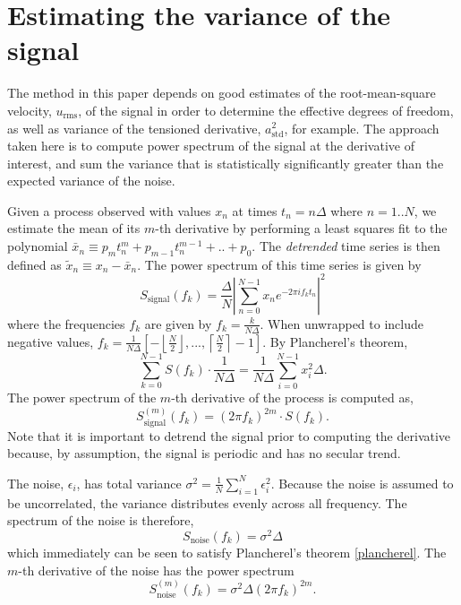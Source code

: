 \documentclass[10pt,journal]{IEEEtran}
\begin{document}
\section{Estimating the variance of the signal}
\label{variance_estimate}

The method in this paper depends on good estimates of the root-mean-square velocity, $u_{\textrm{rms}}$, of the signal in order to determine the effective degrees of freedom, as well as variance of the tensioned derivative, $a_{\textrm{std}}^2$, for example. The approach taken here is to compute power spectrum of the signal at the derivative of interest, and sum the variance that is statistically significantly greater than the expected variance of the noise.

Given a process observed with values $x_n$ at times $t_n = n \Delta$ where $n=1..N$, we estimate the mean of its $m$-th derivative by performing a least squares fit to the polynomial $\bar{x}_n \equiv p_m t_n^m + p_{m-1} t_n^{m-1} + .. + p_0$. The \emph{detrended} time series is then defined as $\tilde{x}_n \equiv x_n - \bar{x}_n$. The power spectrum of this time series is given by
\begin{equation}
S_{\textrm{signal}}(f_k) = \frac{\Delta}{N} \left\lvert \sum_{n=0}^{N-1} x_n e^{-2\pi i f_k t_n} \right\rvert^2
\end{equation}
where the frequencies $f_k$ are given by $f_k = \frac{k}{N\Delta}$. When unwrapped to include negative values, $f_k = \frac{1}{N \Delta} \left[ -\left\lfloor \frac{N}{2} \right\rfloor,...,\left\lceil \frac{N}{2} \right\rceil -1 \right]$. By Plancherel's theorem,
\begin{equation}
\label{plancherel}
\sum_{k=0}^{N-1} S(f_k) \cdot \frac{1}{N \Delta} = \frac{1}{N \Delta} \sum_{i=0}^{N-1} x_i^2 \Delta.
\end{equation}
The power spectrum of the $m$-th derivative of the process is computed as,
\begin{equation}
S_{\textrm{signal}}^{(m)}(f_k) = (2 \pi f_k)^{2m} \cdot S(f_k).
\end{equation}
Note that it is important to detrend the signal prior to computing the derivative because, by assumption, the signal is periodic and has no secular trend.

The noise, $\epsilon_i$, has total variance $\sigma^2 = \frac{1}{N} \sum_{i=1}^{N} \epsilon_i^2$. Because the noise is assumed to be uncorrelated, the variance distributes evenly across all frequency. The spectrum of the noise is therefore,
\begin{equation}
S_{\textrm{noise}}(f_k) = \sigma^2 \Delta
\end{equation}
which immediately can be seen to satisfy Plancherel's theorem \ref{plancherel}. The $m$-th derivative of the noise has the power spectrum
\begin{equation}
S_{\textrm{noise}}^{(m)}(f_k) = \sigma^2 \Delta (2 \pi f_k)^{2m}.
\end{equation}
\end{document}
